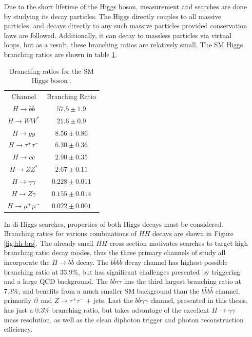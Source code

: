 Due to the short lifetime of the Higgs boson, measurement and searches are done by studying its decay particles. The Higgs directly couples to all massive particles, and decays directly to any such massive particles provided conservation laws are followed. Additionally, it can decay to massless particles via virtual loops, but as a result, these branching ratios are relatively small. The \gls{SM} Higgs branching ratios are shown in table \ref{tab:higgs-decays}. 

\begin{table}[!thp]
    \centering
    \begin{tabular}{c|c}
        Channel & Branching Ratio \\
        \cline{1-2}
        $H \rightarrow b\bar{b}$ & $57.5 \pm 1.9$\\
        $H \rightarrow WW^*$ & $21.6 \pm 0.9$\\
        $H \rightarrow gg$ & $8.56 \pm 0.86$\\
        $H \rightarrow \tau^+ \tau^-$ & $6.30 \pm 0.36$\\
        $H \rightarrow c\bar{c}$ & $2.90 \pm 0.35$\\
        $H \rightarrow ZZ^*$ & $2.67 \pm 0.11$\\
        $H \rightarrow \gamma\gamma$ & $0.228 \pm 0.011$\\
        $H \rightarrow Z\gamma$ & $0.155 \pm 0.014$\\
        $H \rightarrow \mu^+ \mu^-$ & $0.022 \pm 0.001$
    \end{tabular}
    \caption{Branching ratios for the \gls{SM} Higgs boson \cite{pdg}.}
    \label{tab:higgs-decays}
\end{table}

In di-Higgs searches, properties of both Higgs decays must be considered. Branching ratios for various combinations of $HH$ decays are shown in Figure \ref{fig:hh-brs}. The already small $HH$ cross section motivates searches to target high branching ratio decay modes, thus the three primary channels of study all incorporate the $H\rightarrow b\bar{b}$ decay. The $b\bar{b}b\bar{b}$ decay channel has highest possible branching ratio at $33.9\%$, but has significant challenges presented by triggering and a large QCD background. The $b\bar{b}\tau \tau$ has the third largest branching ratio at $7.3\%$, and benefits from a much smaller \gls{SM} background than the $b\bar{b}b\bar{b}$ channel, primarily $t\bar{t}$ and $Z\rightarrow \tau^+ \tau^-$ + jets. Last the $b\bar{b} \gamma \gamma$ channel, presented in this thesis, has just a $0.3\%$ branching ratio, but takes advantage of the excellent $H\rightarrow \gamma\gamma$ mass resolution, as well as the clean diphoton trigger and photon reconstruction efficiency.

